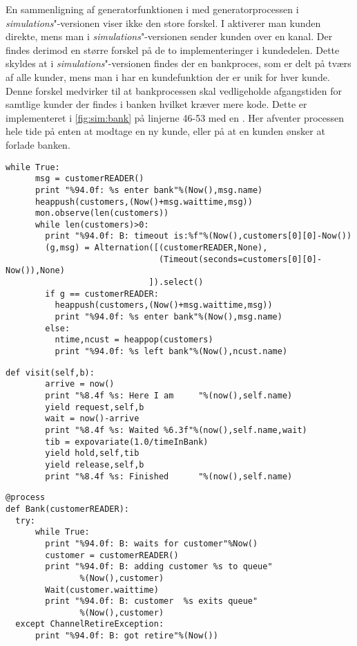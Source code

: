 En sammenligning af generatorfunktionen i \simpy med generatorprocessen i \emph{simulations}"-versionen viser ikke den store forskel. I \simpy aktiverer man kunden direkte, mens man i \emph{simulations}"-versionen sender kunden over en kanal. Der findes derimod en større forskel på de to implementeringer i kundedelen. Dette skyldes at i \emph{simulations}"-versionen findes der en bankproces, som er delt på tværs af alle kunder, mens man i \simpy har en kundefunktion der er unik for hver kunde. Denne forskel medvirker til at bankprocessen skal vedligeholde afgangstiden for samtlige kunder der findes i banken  hvilket kræver mere kode. Dette er implementeret i  \cref{fig:sim:bank} på linjerne 46-53 med en . Her afventer processen hele tide på enten at modtage en ny kunde, eller på at en kunden ønsker at forlade banken.
\begin{lstlisting}[firstnumber=39,float=hbtp, label=fig:sim:bank, caption= Uddrag af bank processen i simulation]
    while True:
      msg = customerREADER()
      print "%94.0f: %s enter bank"%(Now(),msg.name)
      heappush(customers,(Now()+msg.waittime,msg))
      mon.observe(len(customers))
      while len(customers)>0:
        print "%94.0f: B: timeout is:%f"%(Now(),customers[0][0]-Now())
        (g,msg) = Alternation([(customerREADER,None),
                               (Timeout(seconds=customers[0][0]- Now()),None)
                             ]).select()
        if g == customerREADER:
          heappush(customers,(Now()+msg.waittime,msg))
          print "%94.0f: %s enter bank"%(Now(),msg.name)
        else:
          ntime,ncust = heappop(customers)
          print "%94.0f: %s left bank"%(Now(),ncust.name) 
\end{lstlisting}
\begin{lstlisting}[firstnumber=20 ,float=hbtp, label=fig:simpy:customer, caption=funktionen \code{visit} i \simpy]
     def visit(self,b):                                
        arrive = now()
        print "%8.4f %s: Here I am     "%(now(),self.name)
        yield request,self,b                          
        wait = now()-arrive
        print "%8.4f %s: Waited %6.3f"%(now(),self.name,wait)
        tib = expovariate(1.0/timeInBank)            
        yield hold,self,tib                          
        yield release,self,b                         
        print "%8.4f %s: Finished      "%(now(),self.name)
\end{lstlisting}
\begin{lstlisting}[firstnumber=33 ,float=hbtp, label=fig:sim:bank2, caption=Bankprocessen hvor banken er en begrænset ressource. ]
  @process
def Bank(customerREADER):
  try:
      while True:
        print "%94.0f: B: waits for customer"%Now()
        customer = customerREADER()
        print "%94.0f: B: adding customer %s to queue"
               %(Now(),customer)
        Wait(customer.waittime)
        print "%94.0f: B: customer  %s exits queue"
               %(Now(),customer)
  except ChannelRetireException:
      print "%94.0f: B: got retire"%(Now())

\end{lstlisting}

